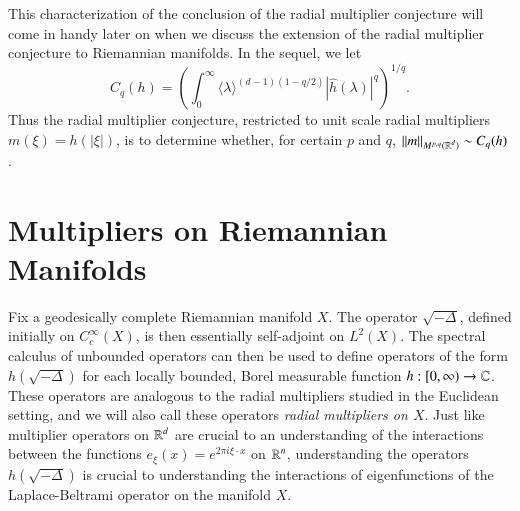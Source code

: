 This characterization of the conclusion of the radial multiplier conjecture will come in handy later on when we discuss the extension of the radial multiplier conjecture to Riemannian manifolds. In the sequel, we let
%
\[ C_q(h) = \left( \int_0^\infty \langle \lambda \rangle^{(d-1)(1 - q/2)} |\widehat{h}(\lambda)|^q \right)^{1/q}. \]
%
Thus the radial multiplier conjecture, restricted to unit scale radial multipliers $m(\xi) = h(|\xi|)$, is to determine whether, for certain $p$ and $q$, $\| m \|_{M^{p,q}(\operatorname{\mathbb{R}}^d)} \sim C_q(h)$.

\section{Multipliers on Riemannian Manifolds}

Fix a geodesically complete Riemannian manifold $X$. The operator $\sqrt{-\Delta}$, defined initially on $C_c^\infty(X)$, is then essentially self-adjoint on $L^2(X)$. The spectral calculus of unbounded operators can then be used to define operators of the form $h(\sqrt{-\Delta})$ for each locally bounded, Borel measurable function $h: [0,\infty) \to \operatorname{\mathbb{C}}$. These operators are analogous to the radial multipliers studied in the Euclidean setting, and we will also call these operators \emph{radial multipliers on $X$}. Just like multiplier operators on $\operatorname{\mathbb{R}}^d$ are crucial to an understanding of the interactions between the functions $e_\xi(x) = e^{2 \pi i \xi \cdot x}$ on $\operatorname{\mathbb{R}}^n$, understanding the operators $h(\sqrt{-\Delta})$ is crucial to understanding the interactions of eigenfunctions of the Laplace-Beltrami operator on the manifold $X$.

